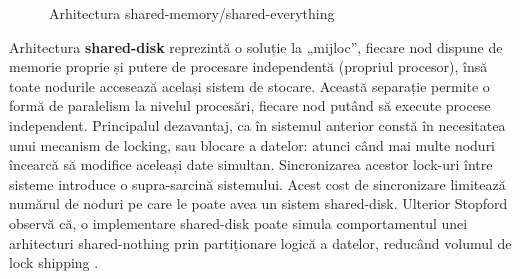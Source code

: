 \begin{figure}[htbp]
    \centering
    \caption{Arhitectura shared-memory/shared-everything}
    \label{fig:shared-everything}
\end{figure}

Arhitectura \textbf{shared-disk} reprezintă o soluție la „mijloc”, fiecare nod dispune de memorie proprie și putere de procesare independentă (propriul procesor), însă toate nodurile accesează același sistem de stocare. Această separație permite o formă de paralelism la nivelul procesări, fiecare nod putând să execute procese independent. Principalul dezavantaj, ca în sistemul anterior constă în necesitatea unui mecanism de locking, sau blocare a datelor: atunci când mai multe noduri încearcă să modifice aceleași date simultan. Sincronizarea acestor lock-uri între sisteme introduce o supra-sarcină sistemului. Acest cost de sincronizare limitează numărul de noduri pe care le poate avea un sistem shared-disk. Ulterior Stopford observă că, o implementare shared-disk poate simula comportamentul unei arhitecturi shared-nothing prin partiționare logică a datelor, reducând volumul de lock shipping \cite{stopford2009}.

